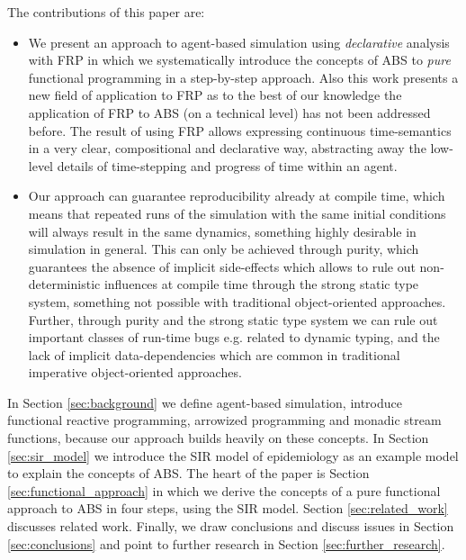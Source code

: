 The contributions of this paper are:
\begin{itemize}
	\item We present an approach to agent-based simulation using \textit{declarative} analysis with FRP in which we systematically introduce the concepts of ABS to \textit{pure} functional programming in a step-by-step approach. Also this work presents a new field of application to FRP as to the best of our knowledge the application of FRP to ABS (on a technical level) has not been addressed before. The result of using FRP allows expressing continuous time-semantics in a very clear, compositional and declarative way, abstracting away the low-level details of time-stepping and progress of time within an agent.
	
	\item Our approach can guarantee reproducibility already at compile time, which means that repeated runs of the simulation with the same initial conditions will always result in the same dynamics, something highly desirable in simulation in general. This can only be achieved through purity, which guarantees the absence of implicit side-effects which allows to rule out non-deterministic influences at compile time through the strong static type system, something not possible with traditional object-oriented approaches. Further, through purity and the strong static type system we can rule out important classes of run-time bugs e.g. related to dynamic typing, and the lack of implicit data-dependencies which are common in traditional imperative object-oriented approaches.
\end{itemize}

In Section \ref{sec:background} we define agent-based simulation, introduce functional reactive programming, arrowized programming and monadic stream functions, because our approach builds heavily on these concepts. In Section \ref{sec:sir_model} we introduce the SIR model of epidemiology as an example model to explain the concepts of ABS. The heart of the paper is Section \ref{sec:functional_approach} in which we derive the concepts of a pure functional approach to ABS in four steps, using the SIR model. Section \ref{sec:related_work} discusses related work. Finally, we draw conclusions and discuss issues in Section \ref{sec:conclusions} and point to further research in Section \ref{sec:further_research}.
